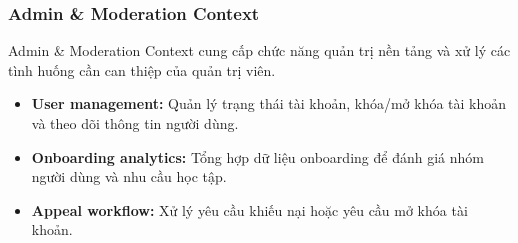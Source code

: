 \subsubsection{Admin \& Moderation Context}
\label{subsubsec:admin-moderation-context}

Admin \& Moderation Context cung cấp chức năng quản trị nền tảng và xử lý các tình huống cần can thiệp của quản trị viên.

\begin{itemize}
    \item \textbf{User management:} Quản lý trạng thái tài khoản, khóa/mở khóa tài khoản và theo dõi thông tin người dùng.
    \item \textbf{Onboarding analytics:} Tổng hợp dữ liệu onboarding để đánh giá nhóm người dùng và nhu cầu học tập.
    \item \textbf{Appeal workflow:} Xử lý yêu cầu khiếu nại hoặc yêu cầu mở khóa tài khoản.
\end{itemize}